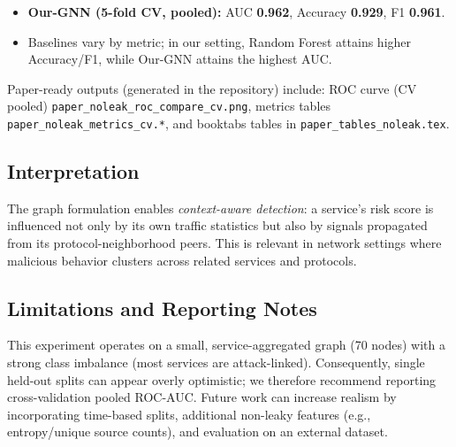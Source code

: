 \begin{itemize}
  \item \textbf{Our-GNN (5-fold CV, pooled):} AUC \textbf{0.962}, Accuracy \textbf{0.929}, F1 \textbf{0.961}. 
  \item Baselines vary by metric; in our setting, Random Forest attains higher Accuracy/F1, while Our-GNN attains the highest AUC.
\end{itemize}

Paper-ready outputs (generated in the repository) include: ROC curve (CV pooled) \texttt{paper\_noleak\_roc\_compare\_cv.png}, metrics tables \texttt{paper\_noleak\_metrics\_cv.*}, and booktabs tables in \texttt{paper\_tables\_noleak.tex}.

\subsection{Interpretation}
The graph formulation enables \emph{context-aware detection}: a service’s risk score is influenced not only by its own traffic statistics but also by signals propagated from its protocol-neighborhood peers. This is relevant in network settings where malicious behavior clusters across related services and protocols.

\subsection{Limitations and Reporting Notes}
This experiment operates on a small, service-aggregated graph (70 nodes) with a strong class imbalance (most services are attack-linked). Consequently, single held-out splits can appear overly optimistic; we therefore recommend reporting cross-validation pooled ROC-AUC. Future work can increase realism by incorporating time-based splits, additional non-leaky features (e.g., entropy/unique source counts), and evaluation on an external dataset.
